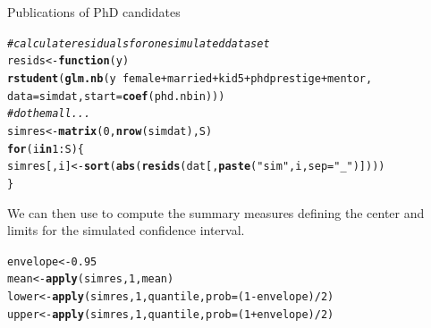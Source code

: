 \documentclass[11pt]{book}\usepackage[]{graphicx}\usepackage[]{color}
\makeatletter
\newcommand{\hlnum}[1]{\textcolor[rgb]{0.686,0.059,0.569}{#1}}%
\newcommand{\hlstr}[1]{\textcolor[rgb]{0.192,0.494,0.8}{#1}}%
\newcommand{\hlcom}[1]{\textcolor[rgb]{0.678,0.584,0.686}{\textit{#1}}}%
\newcommand{\hlopt}[1]{\textcolor[rgb]{0,0,0}{#1}}%
\newcommand{\hlstd}[1]{\textcolor[rgb]{0.345,0.345,0.345}{#1}}%
\newcommand{\hlkwa}[1]{\textcolor[rgb]{0.161,0.373,0.58}{\textbf{#1}}}%
\newcommand{\hlkwb}[1]{\textcolor[rgb]{0.69,0.353,0.396}{#1}}%
\newcommand{\hlkwc}[1]{\textcolor[rgb]{0.333,0.667,0.333}{#1}}%
\newcommand{\hlkwd}[1]{\textcolor[rgb]{0.737,0.353,0.396}{\textbf{#1}}}%
\newenvironment{kframe}{%
 \def\at@end@of@kframe{}%
 \ifinner\ifhmode%
  \def\at@end@of@kframe{\end{minipage}}%
  \begin{minipage}{\columnwidth}%
 \fi\fi%
 \def\FrameCommand##1{\hskip\@totalleftmargin \hskip-\fboxsep
 \colorbox{shadecolor}{##1}\hskip-\fboxsep
     \hskip-\linewidth \hskip-\@totalleftmargin \hskip\columnwidth}%
 \MakeFramed {\advance\hsize-\width
   \@totalleftmargin\z@ \linewidth\hsize
   \@setminipage}}%
 {\par\unskip\endMakeFramed%
 \at@end@of@kframe}
\newenvironment{knitrout}{}{} %
\renewenvironment{knitrout}{\small\renewcommand{\baselinestretch}{.85}}{} %
\makeatother
\begin{document}
\begin{Example}[phdpubs6]{Publications of PhD candidates}
\begin{knitrout}
\color{fgcolor}\begin{kframe}
\begin{alltt}
\hlcom{# calculate residuals for one simulated data set}
\hlstd{resids} \hlkwb{<-} \hlkwa{function}\hlstd{(}\hlkwc{y}\hlstd{)}
  \hlkwd{rstudent}\hlstd{(}\hlkwd{glm.nb}\hlstd{(y} \hlopt{~} \hlstd{female} \hlopt{+} \hlstd{married} \hlopt{+} \hlstd{kid5} \hlopt{+} \hlstd{phdprestige} \hlopt{+} \hlstd{mentor,}
                  \hlkwc{data}\hlstd{=simdat,} \hlkwc{start}\hlstd{=}\hlkwd{coef}\hlstd{(phd.nbin)))}
\hlcom{# do them all ...}
\hlstd{simres} \hlkwb{<-} \hlkwd{matrix}\hlstd{(}\hlnum{0}\hlstd{,} \hlkwd{nrow}\hlstd{(simdat), S)}
\hlkwa{for}\hlstd{(i} \hlkwa{in} \hlnum{1}\hlopt{:}\hlstd{S) \{}
        \hlstd{simres[,i]} \hlkwb{<-} \hlkwd{sort}\hlstd{(}\hlkwd{abs}\hlstd{(}\hlkwd{resids}\hlstd{(dat[,}\hlkwd{paste}\hlstd{(}\hlstr{"sim"}\hlstd{, i,} \hlkwc{sep}\hlstd{=}\hlstr{"_"}\hlstd{)])))}
\hlstd{\}}
\end{alltt}
\end{kframe}
\end{knitrout}
We can then use  to compute the summary measures defining the center and limits for the
simulated confidence interval.
\begin{knitrout}
\color{fgcolor}\begin{kframe}
\begin{alltt}
\hlstd{envelope} \hlkwb{<-} \hlnum{0.95}
\hlstd{mean} \hlkwb{<-} \hlkwd{apply}\hlstd{(simres,} \hlnum{1}\hlstd{, mean)}
\hlstd{lower} \hlkwb{<-} \hlkwd{apply}\hlstd{(simres,} \hlnum{1}\hlstd{, quantile,} \hlkwc{prob}\hlstd{=(}\hlnum{1} \hlopt{-} \hlstd{envelope)}\hlopt{/}\hlnum{2}\hlstd{)}
\hlstd{upper} \hlkwb{<-} \hlkwd{apply}\hlstd{(simres,} \hlnum{1}\hlstd{, quantile,} \hlkwc{prob}\hlstd{=(}\hlnum{1} \hlopt{+} \hlstd{envelope)}\hlopt{/}\hlnum{2}\hlstd{)}
\end{alltt}
\end{kframe}
\end{knitrout}


\end{Example}
\end{document}

